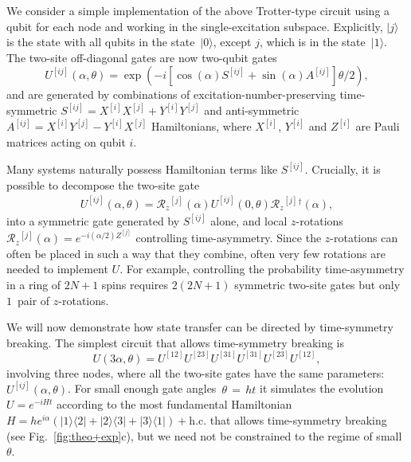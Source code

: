 \documentclass[aps,prx,10pt,
               superscriptaddress,
               twocolumn,
               longbibliography,
showpacs]{revtex4-1}
\theoremstyle{plain}
\theoremstyle{definition}
\newcommand{\bra}[1]{\mbox{$\langle #1|$}}
\newcommand{\ket}[1]{\ensuremath{|#1\rangle}}
\newcommand{\hs}{h}
\newcommand{\zrot}{\mathcal{R}_z}
\newcommand{\site}[1]{^{[#1]}}  %
\begin{document}
We consider a simple implementation of the above Trotter-type circuit using a qubit for
each node and working in the single-excitation
subspace. Explicitly, $\ket{j}$ is the state with all qubits in
the state~$\ket{0}$, except $j$, which is in the state~$\ket{1}$. The two-site off-diagonal gates are now two-qubit gates
\begin{equation}\label{eqn:mixing}
U\site{ij}(\alpha, \theta)
= \exp \left(-i \left[ \cos(\alpha)S\site{ij}
+\sin(\alpha ) A\site{ij}\right] \theta/2 \right),
\end{equation}
and are generated by combinations of excitation-number-preserving
time-symmetric $S\site{ij} = X\site{i}X\site{j} + Y\site{i}Y\site{j}$ and anti-symmetric $A\site{ij} =
X\site{i}Y\site{j} -Y\site{i}X\site{j}$ Hamiltonians, where $X\site{i}$, $Y\site{i}$ and $Z\site{i}$ are Pauli
matrices acting on qubit $i$.

Many systems naturally possess Hamiltonian terms like
$S\site{ij}$.
Crucially, it is possible to decompose the two-site gate
\begin{align}
\label{eqn:zedeqv}
U\site{ij}(\alpha, \theta)
= \zrot{}\site{j}(\alpha) U\site{ij}(0, \theta) \zrot{}\site{j}{^\dagger}(\alpha),
\end{align}
into a symmetric gate generated by $S\site{ij}$ alone, and
local $z$-rotations $\zrot{}\site{j}(\alpha) = e^{-i(\alpha/2)Z\site{j}}$ controlling
time-asymmetry.
Since the $z$-rotations can often be placed in such a way that they combine, often very few rotations are needed to implement $U$.
For example, controlling the probability time-asymmetry in a ring
of $2N+1$ spins requires $2(2N+1)$ symmetric two-site gates but only $1$~pair of
$z$-rotations.

We will now demonstrate how state transfer can be directed by time-symmetry breaking.
The simplest circuit that allows time-symmetry breaking is
\begin{equation}
\label{eq:circuit}
U(3 \alpha, \theta) = U\site{12} U\site{23} U\site{31} U\site{31} U\site{23} U\site{12},
\end{equation}
involving three nodes,
where all the two-site gates have the same parameters: $U\site{ij}(\alpha, \theta)$.
For small enough gate angles~$\theta\,{=}\,ht$ it simulates the evolution $U = e^{-iHt}$ according to the most fundamental Hamiltonian
$H = \hs e^{i \alpha} \left( \ket{1}\bra{2} + \ket{2}\bra{3} + \ket{3}\bra{1} \right) + \mathrm{h.c.}$ that 
allows time-symmetry breaking (see Fig.~\ref{fig:theo+exp}c), but we need not be constrained to the regime of small~$\theta$.
\end{document}
